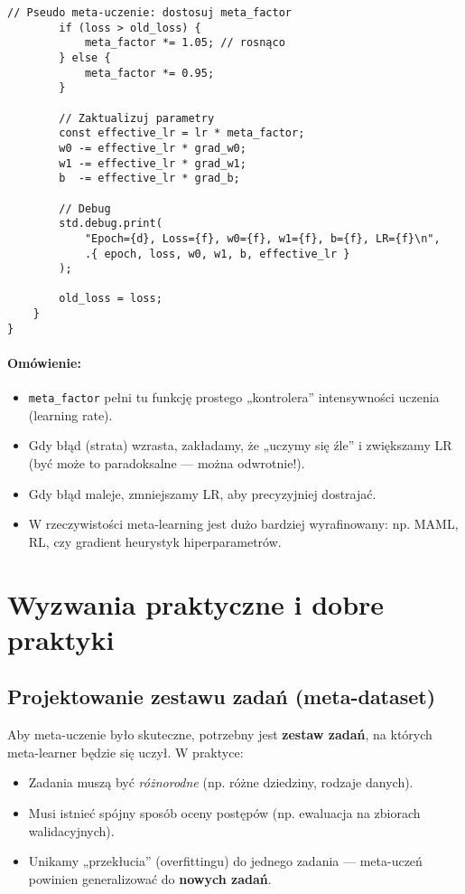 \documentclass[12pt,a4paper]{article}
\begin{document}
\begin{lstlisting}[language=zig, caption=Prosty szkielet HPC w Zig z adaptacją LR]
        // Pseudo meta-uczenie: dostosuj meta_factor
        if (loss > old_loss) {
            meta_factor *= 1.05; // rosnąco
        } else {
            meta_factor *= 0.95;
        }

        // Zaktualizuj parametry
        const effective_lr = lr * meta_factor;
        w0 -= effective_lr * grad_w0;
        w1 -= effective_lr * grad_w1;
        b  -= effective_lr * grad_b;

        // Debug
        std.debug.print(
            "Epoch={d}, Loss={f}, w0={f}, w1={f}, b={f}, LR={f}\n",
            .{ epoch, loss, w0, w1, b, effective_lr }
        );

        old_loss = loss;
    }
}
\end{lstlisting}

\paragraph{Omówienie:}
\begin{itemize}
    \item \texttt{meta\_factor} pełni tu funkcję prostego „kontrolera” intensywności uczenia (learning rate).  
    \item Gdy błąd (strata) wzrasta, zakładamy, że „uczymy się źle” i zwiększamy LR (być może to paradoksalne — można odwrotnie!).  
    \item Gdy błąd maleje, zmniejszamy LR, aby precyzyjniej dostrajać.  
    \item W rzeczywistości meta-learning jest dużo bardziej wyrafinowany: np. MAML, RL, czy gradient heurystyk hiperparametrów.
\end{itemize}

\section{Wyzwania praktyczne i dobre praktyki}

\subsection{Projektowanie zestawu zadań (meta-dataset)}

Aby meta-uczenie było skuteczne, potrzebny jest \textbf{zestaw zadań}, na których meta-learner będzie się uczył. W praktyce:
\begin{itemize}
    \item Zadania muszą być \textit{różnorodne} (np. różne dziedziny, rodzaje danych).
    \item Musi istnieć spójny sposób oceny postępów (np. ewaluacja na zbiorach walidacyjnych).
    \item Unikamy „przekłucia” (overfittingu) do jednego zadania — meta-uczeń powinien generalizować do \textbf{nowych zadań}.
\end{itemize}
\end{document}
